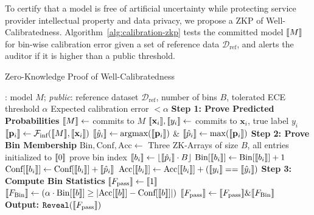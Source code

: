 To certify that a model is free of artificial uncertainty while protecting service provider intellectual property and data privacy, we propose a ZKP of Well-Calibratedness. Algorithm~\ref{alg:calibration-zkp} tests the committed model $\llbracket M \rrbracket$ for bin-wise calibration error given a set of reference data $\mathcal{D}_{\text{ref}}$, and alerts the auditor if it is higher than a public threshold. %

\begin{algorithm}[h]
\small

\caption{Zero-Knowledge Proof of Well-Calibratedness}
\label{alg:calibration-zkp}
\begin{algorithmic}[1]
\Require
\prover: model $M$; \emph{public}: reference dataset $\mathcal{D}_{\text{ref}}$, number of bins $B$, tolerated ECE threshold $\alpha$
\Ensure Expected calibration error $< \alpha$
\State \textbf{Step 1: Prove Predicted Probabilities}
\State $\llbracket M \rrbracket \gets$ \prover commits to $M$
    \State $\llbracket \mathbf{x}_i \rrbracket, \llbracket y_i \rrbracket \gets$ \prover commits to $\mathbf{x}_i$, true label $y_i$
    \State $\llbracket \mathbf{p}_i \rrbracket \gets \mathcal{F}_{\text{inf}}(\llbracket M \rrbracket,\llbracket \mathbf{x}_i \rrbracket)$ {\scriptsize{}}
    \State $\llbracket \hat{y}_i \rrbracket \gets \text{argmax}(\llbracket \mathbf{p}_i \rrbracket)$ \& $\llbracket \hat{p}_i \rrbracket \gets \max (\llbracket \mathbf{p}_i \rrbracket)$
\EndFor
\State \textbf{Step 2: Prove Bin Membership}
\State $\text{Bin}, \text{Conf}, \text{Acc} \gets $ Three ZK-Arrays of size $B$, all entries initialized to $\llbracket 0 \rrbracket$
    \State prove bin index $\llbracket b_i \rrbracket \gets \lfloor \llbracket \hat{p}_i \rrbracket \cdot B \rfloor$ {\scriptsize{}}
    \State $\text{Bin}[\llbracket b_i \rrbracket] \gets \text{Bin}[\llbracket b_i \rrbracket] + 1$
    \State $\text{Conf}[\llbracket b_i \rrbracket] \gets \text{Conf}[\llbracket b_i \rrbracket] + \llbracket \hat{p}_i \rrbracket$
    \State $\text{Acc}[\llbracket b_i \rrbracket] \gets \text{Acc}[\llbracket b_i \rrbracket] + (\llbracket y_i \rrbracket == \llbracket \hat{y}_i \rrbracket)$
\EndFor
\State \textbf{Step 3: Compute Bin Statistics}
\State $\llbracket F_\text{pass} \rrbracket \gets \llbracket 1 \rrbracket$ {\scriptsize{}}
    \State $\llbracket F_\text{Bin} \rrbracket \gets (\alpha \cdot \text{Bin}[\llbracket b \rrbracket] \geq \left| \text{Acc}[\llbracket b \rrbracket] - \text{Conf}[\llbracket b \rrbracket] \right|)$
    {\scriptsize{}}
    \State $\llbracket F_\text{pass} \rrbracket \gets \llbracket F_\text{pass} \rrbracket \& \llbracket F_\text{Bin} \rrbracket$ 
\EndFor
\State \textbf{Output:} $\texttt{Reveal}(\llbracket F_\text{pass} \rrbracket)$
\end{algorithmic}
\end{algorithm}


